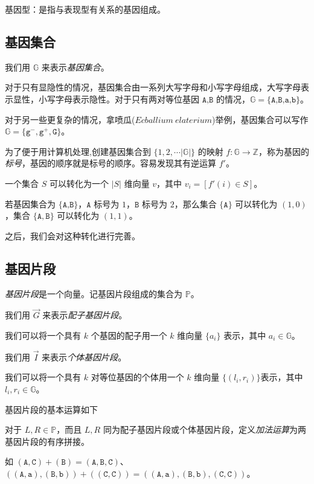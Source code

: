 \documentclass[12pt]{article} %
\begin{document}
基因型：是指与表现型有关系的基因组成。


\subsection{基因集合}

我们用 $\mathbb{G}$ 来表示\textsl{基因集合}。

对于只有显隐性的情况，基因集合由一系列大写字母和小写字母组成，大写字母表示显性，小写字母表示隐性。对于只有两对等位基因 $\texttt{A,B}$ 的情况，$\mathbb{G}=\{\texttt{A,B,a,b}\}$。

对于另一些更复杂的情况，拿喷瓜($\mathit{Ecballium\ elaterium}$)举例，基因集合可以写作 $\mathbb{G}=\{\texttt{g}^{-},\texttt{g}^{+},\texttt{G}\}$。

为了便于用计算机处理,创建基因集合到 $\{1,2,\cdots |\mathbb{G}|\}$ 的映射 $f:\mathbb{G} \to \mathbb{Z}$，称为基因的\textsl{标号}，基因的顺序就是标号的顺序。容易发现其有逆运算 $f'$。

一个集合 $S$ 可以转化为一个 $|S|$ 维向量 $v$，其中 $v_i=[f'(i) \in S]$。

若基因集合为 $\{\texttt{A,B}\}$，$\texttt{A}$ 标号为 $1$，$\texttt{B}$ 标号为 $2$，那么集合 $\{\texttt{A}\}$ 可以转化为 $(1,0)$，集合 $\{\texttt{A},\texttt{B}\}$ 可以转化为 $(1,1)$。

之后，我们会对这种转化进行完善。

\subsection{基因片段}

\textsl{基因片段}是一个向量。记基因片段组成的集合为 $\mathbb{P}$。

我们用 $\vec G$ 来表示\textsl{配子基因片段}。

我们可以将一个具有 $k$ 个基因的配子用一个 $k$ 维向量 $\{a_i\}$ 表示，其中 $a_i \in \mathbb{G}$。

我们用 $\vec I$ 来表示\textsl{个体基因片段}。

我们可以将一个具有 $k$ 对等位基因的个体用一个 $k$ 维向量 $\{(l_i,r_i)\}$表示，其中 $l_i,r_i \in \mathbb{G}$。

基因片段的基本运算如下

对于 $L,R \in \mathbb{P}$，而且 $L,R$ 同为配子基因片段或个体基因片段，定义\textsl{加法运算}为两基因片段的有序拼接。

如 $(\texttt{A},\texttt{C}) + (\texttt{B}) = (\texttt{A},\texttt{B},\texttt{C})$、$((\texttt{A},\texttt{a}),(\texttt{B},\texttt{b}))+((\texttt{C},\texttt{C}))=((\texttt{A},\texttt{a}),(\texttt{B},\texttt{b}),(\texttt{C},\texttt{C}))$。
\end{document}

